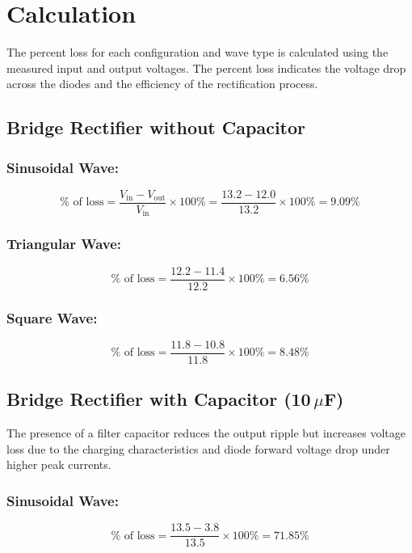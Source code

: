\section{Calculation}

The percent loss for each configuration and wave type is calculated using the measured input and output voltages. The percent loss indicates the voltage drop across the diodes and the efficiency of the rectification process.

\subsection{Bridge Rectifier without Capacitor}

\subsubsection{Sinusoidal Wave:}
\begin{equation}
  \% \text{ of loss} = \frac{V_{\text{in}} - V_{\text{out}}}{V_{\text{in}}} \times 100\%
  = \frac{13.2 - 12.0}{13.2} \times 100\% = 9.09\%
\end{equation}

\subsubsection{Triangular Wave:}
\begin{equation}
  \% \text{ of loss} = \frac{12.2 - 11.4}{12.2} \times 100\% = 6.56\%
\end{equation}

\subsubsection{Square Wave:}
\begin{equation}
  \% \text{ of loss} = \frac{11.8 - 10.8}{11.8} \times 100\% = 8.48\%
\end{equation}

\subsection{Bridge Rectifier with Capacitor (10\,$\mu$F)}

The presence of a filter capacitor reduces the output ripple but increases voltage loss due to the charging characteristics and diode forward voltage drop under higher peak currents.

\subsubsection{Sinusoidal Wave:}
\begin{equation}
  \% \text{ of loss} = \frac{13.5 - 3.8}{13.5} \times 100\% = 71.85\%
\end{equation}

